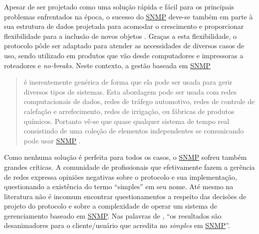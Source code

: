\documentclass[twoside,english,brazilian]{UNISINOSmonografia}
\begin{document}
Apesar de ser projetado como uma solução rápida e fácil para os principais 
problemas enfrentados na época, o sucesso do \hyperref[siglas]{SNMP} deve-se também em parte à 
sua estrutura de dados projetada para acomodar o crescimento e proporcionar 
flexibilidade para a inclusão de novos objetos \cite{stallings1999snmp}.
Graças a esta flexibilidade, o protocolo pôde ser adaptado para atender as 
necessidades de diversos casos de uso, sendo utilizado em produtos que vão 
desde computadores e impressoras a roteadores e \textit{no-breaks}.
Neste contexto, a gestão baseada em \hyperref[siglas]{SNMP}

\begin{quote}
é inerentemente genérica de forma que ela pode ser usada para gerir diversos 
tipos de sistemas. Esta abordagem pode ser usada com redes computacionais de 
dados, redes de tráfego automotivo, redes de controle de calefação e 
arrefecimento, redes de irrigação, ou fábricas de produtos químicos. Portanto 
vê-se que quase qualquer sistema de tempo real consistindo de uma coleção de 
elementos independentes se comunicando pode usar \hyperref[siglas]{SNMP}
\cite[p.~2]{perkins1997understanding}.
\end{quote}

Como nenhuma solução é perfeita para todos os casos, o \hyperref[siglas]{SNMP} sofreu também 
grandes críticas. 
A comunidade de profissionais que efetivamente fazem a gerência de redes 
expressa opiniões negativas sobre o protocolo e sua implementação, 
questionando a existência do termo ``simples'' em seu nome.
Até mesmo na literatura não é incomum encontrar questionamentos a respeito das 
decisões de projeto do protocolo e sobre a complexidade de operar um sistema 
de gerenciamento baseado em \hyperref[siglas]{SNMP}.
Nas palavras de , ``os resultados são 
desanimadores para o cliente/usuário que acredita no 
\textit{simples} em \hyperref[siglas]{SNMP}''.

\end{document}
